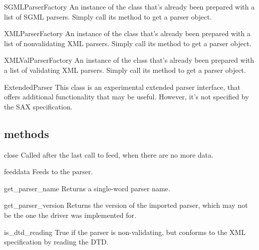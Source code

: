 \documentclass{howto}
\begin{document}
\begin{datadesc}{SGMLParserFactory}
An instance of the  class that's already been
prepared with a list of SGML parsers.  Simply call its
 method to get a parser object. 
\end{datadesc}

\begin{datadesc}{XMLParserFactory}
An instance of the  class that's already been
prepared with a list of nonvalidating XML parsers.  Simply call its
 method to get a parser object. 
\end{datadesc}

\begin{datadesc}{XMLValParserFactory}
An instance of the  class that's already been
prepared with a list of validating XML parsers.  Simply call its
 method to get a parser object. 
\end{datadesc}

\begin{classdesc}{ExtendedParser}{}
This class is an experimental extended parser interface, that offers
additional functionality that may be useful.  However, it's not
specified by the SAX specification.
\end{classdesc}

\subsection{ methods}

\begin{methoddesc}{close}{}
Called after the last call to feed, when there are no more data.
\end{methoddesc}

\begin{methoddesc}{feed}{data}
Feeds  to the parser.
\end{methoddesc}

\begin{methoddesc}{get_parser_name}{}
Returns a single-word parser name.
\end{methoddesc}

\begin{methoddesc}{get_parser_version}{}
Returns the version of the imported parser, which may not be the
one the driver was implemented for.
\end{methoddesc}

\begin{methoddesc}{is_dtd_reading}{}
True if the parser is non-validating, but conforms to the XML specification by
reading the DTD.
\end{methoddesc}
\end{document}
